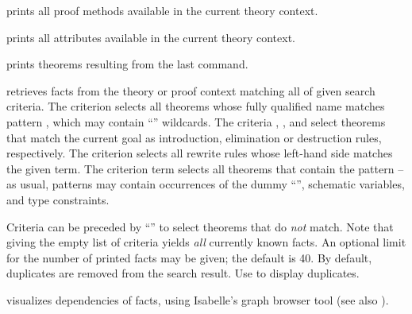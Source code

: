 \begin{isabellebody}
\begin{isamarkuptext}
\begin{descr}
  \item [\hyperlink{command.print-methods}{\mbox{\isa{\isacommand{print{\isacharunderscore}methods}}}}] prints all proof methods
  available in the current theory context.
  
  \item [\hyperlink{command.print-attributes}{\mbox{\isa{\isacommand{print{\isacharunderscore}attributes}}}}] prints all attributes
  available in the current theory context.
  
  \item [\hyperlink{command.print-theorems}{\mbox{\isa{\isacommand{print{\isacharunderscore}theorems}}}}] prints theorems resulting from
  the last command.
  
  \item [\hyperlink{command.find-theorems}{\mbox{\isa{\isacommand{find{\isacharunderscore}theorems}}}}~\isa{criteria}] retrieves facts
  from the theory or proof context matching all of given search
  criteria.  The criterion  selects all theorems
  whose fully qualified name matches pattern , which may
  contain ``\isa{{\isachardoublequote}{\isacharasterisk}{\isachardoublequote}}'' wildcards.  The criteria ,
  , and  select theorems that match the
  current goal as introduction, elimination or destruction rules,
  respectively.  The criterion  selects all rewrite
  rules whose left-hand side matches the given term.  The criterion
  term  selects all theorems that contain the pattern  -- as usual, patterns may contain occurrences of the dummy
  ``\isa{{\isacharunderscore}}'', schematic variables, and type constraints.
  
  Criteria can be preceded by ``\isa{{\isachardoublequote}{\isacharminus}{\isachardoublequote}}'' to select theorems that
  do \emph{not} match. Note that giving the empty list of criteria
  yields \emph{all} currently known facts.  An optional limit for the
  number of printed facts may be given; the default is 40.  By
  default, duplicates are removed from the search result. Use
   to display duplicates.
  
  \item [\hyperlink{command.thm-deps}{\mbox{\isa{\isacommand{thm{\isacharunderscore}deps}}}}~\isa{{\isachardoublequote}a\isactrlsub {\isadigit{1}}\ {\isasymdots}\ a\isactrlsub n{\isachardoublequote}}]
  visualizes dependencies of facts, using Isabelle's graph browser
  tool (see also \cite{isabelle-sys}).
  

\end{descr}
\end{isamarkuptext}
\end{isabellebody}
